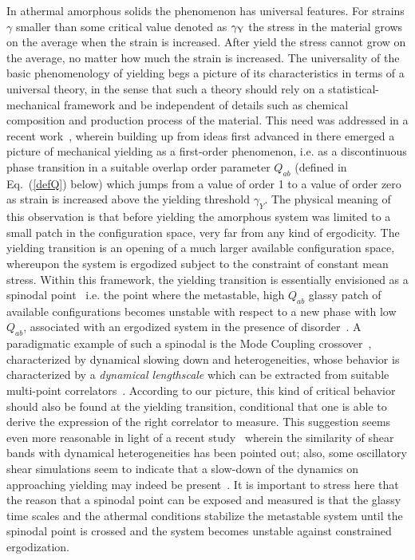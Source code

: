 \documentclass[9pt,twocolumn,twoside]{pnas-new}
\begin{document}
In athermal amorphous solids the phenomenon has universal features. For strains $\gamma$ smaller than some critical value denoted as $\gamma_{\rm Y}$ the stress in the material grows on the average when the strain is increased. After yield the stress cannot grow on the average, no matter how much the strain is increased. The universality of the basic phenomenology of yielding begs a picture of its characteristics in terms of a universal theory, in the sense that such a theory should rely on a statistical-mechanical framework and be independent of details such as chemical composition and production process of the material. This need was addressed in a recent work~\cite{16JPRS}, wherein building up from ideas first advanced in \cite{16RU} there emerged a picture of mechanical yielding as a first-order phenomenon, i.e. as a discontinuous phase transition in a suitable overlap order parameter $Q_{ab}$ (defined in Eq.~(\ref{defQ}) below) which jumps from a value of order 1 to a value of order zero as strain is increased above the yielding threshold $\gamma_Y$. The physical meaning of this observation is that before yielding the amorphous system was limited to a small patch in the configuration space, very far from any
kind of ergodicity. The yielding transition is an opening of a much larger available configuration space, whereupon the system is ergodized subject to the constraint of constant mean stress. Within this framework, the yielding transition is essentially envisioned as a spinodal point~\cite{16UZ} i.e. the point where the metastable, high $Q_{ab}$ glassy patch of available configurations becomes unstable with respect to a new phase with low $Q_{ab}$, associated with an ergodized system in the presence of disorder~\cite{16NBT}. A paradigmatic example of such a spinodal is the Mode Coupling crossover~\cite{11BB}, characterized by dynamical slowing down and heterogeneities, whose behavior is characterized by a \emph{dynamical lengthscale} which can be extracted from suitable multi-point correlators~\cite{11BB}. According to our picture, this kind of critical behavior should also be found at the yielding transition, conditional that one is able to derive the expression of the right correlator to measure. This suggestion seems even more reasonable in light of a recent study~\cite{16SCH} wherein the similarity of shear bands with dynamical heterogeneities has been pointed out; also, some oscillatory shear simulations seem to indicate that a slow-down of the dynamics on approaching yielding may indeed be present~\cite{17RL,LAS16}. It is important to stress here that the reason that a spinodal point can be exposed and measured is that the
glassy time scales and the athermal conditions stabilize the metastable system until the spinodal point is crossed and the system becomes unstable against constrained ergodization.
\end{document}

